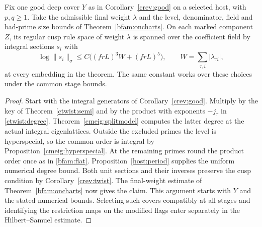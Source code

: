 \begin{corollary}
\label{cmeig:final}
Fix one good deep cover \(Y\) as in Corollary~\ref{crev:good}
on a selected host, with \(p,q\ge1\). Take the admissible final
weight \(\lambda\) and the level, denominator, field and bad-prime
size bounds of Theorem~\ref{bfam:oncharts}.
On each marked component \(Z\), its regular cusp rule space of
weight \(\lambda\) is spanned over the coefficient field by
integral sections \(s_i\) with
\[
     \log\|s_i\|_{\sigma}\le
          C\bigl((frL)^3 W+(frL)^5\bigr),\qquad
     W=\sum_{\tau,i}|\lambda_{\tau i}|,
\]
at every embedding in the theorem. The same constant works over
these choices under the common stage bounds.
\end{corollary}
\begin{proof}
Start with the integral generators of Corollary~\ref{crev:good}.
Multiply by the key of Theorem~\ref{ctwist:semi} and by the
product with exponents \(-j_\tau\) in \eqref{ctwist:degree}.
Theorem~\ref{cmeig:splitmodel} computes the latter degree at the
actual integral eigenlattices. Outside the excluded primes the
level is hyperspecial, so the common order is integral by
Proposition~\ref{cmeig:hyperspecial}. At the remaining primes
round the product order once as in \eqref{bfam:flat}.
Proposition~\ref{host:period} supplies the uniform numerical
degree bound. Both unit sections and their inverses preserve the
cusp condition by Corollary~\ref{crev:twist}. The final-weight
estimate of Theorem~\ref{bfam:oncharts} now gives the claim.
This argument starts with \(Y\) and the stated numerical bounds.
Selecting such covers compatibly at all stages and identifying the
restriction maps on the modified flags enter separately in the
Hilbert--Samuel estimate.
\end{proof}
